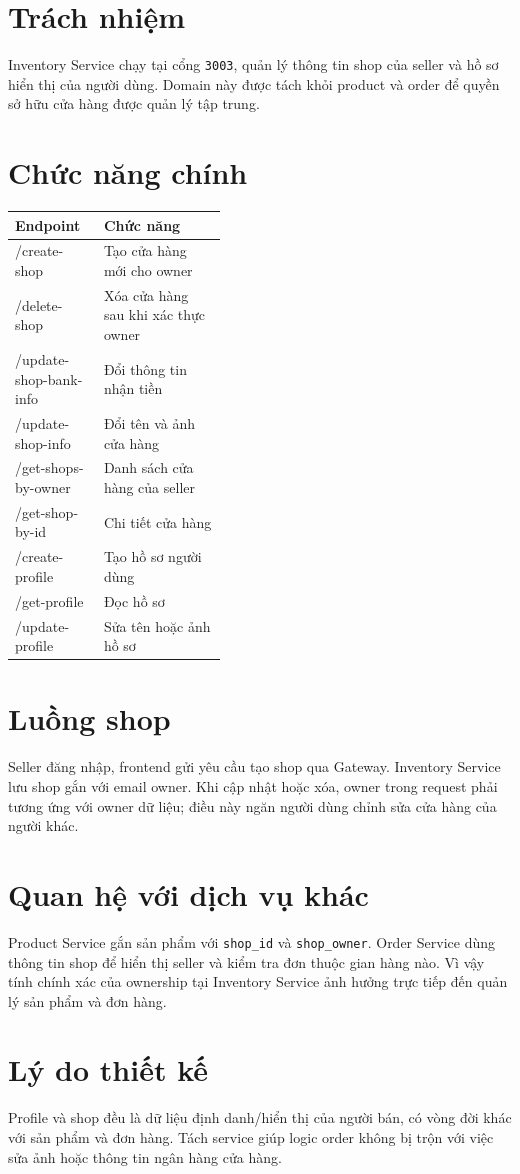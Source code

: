 \documentclass[12pt]{article}
\begin{document}

\section{Trách nhiệm}
Inventory Service chạy tại cổng \texttt{3003}, quản lý thông tin shop của seller và hồ sơ hiển thị của người dùng. Domain này được tách khỏi product và order để quyền sở hữu cửa hàng được quản lý tập trung.

\section{Chức năng chính}
\begin{tabularx}{\linewidth}{>{\ttfamily}p{0.42\linewidth} X}
\toprule
Endpoint & Chức năng \\
\midrule
/create-shop & Tạo cửa hàng mới cho owner \\
/delete-shop & Xóa cửa hàng sau khi xác thực owner \\
/update-shop-bank-info & Đổi thông tin nhận tiền \\
/update-shop-info & Đổi tên và ảnh cửa hàng \\
/get-shops-by-owner & Danh sách cửa hàng của seller \\
/get-shop-by-id & Chi tiết cửa hàng \\
/create-profile & Tạo hồ sơ người dùng \\
/get-profile & Đọc hồ sơ \\
/update-profile & Sửa tên hoặc ảnh hồ sơ \\
\bottomrule
\end{tabularx}

\section{Luồng shop}
Seller đăng nhập, frontend gửi yêu cầu tạo shop qua Gateway. Inventory Service lưu shop gắn với email owner. Khi cập nhật hoặc xóa, owner trong request phải tương ứng với owner dữ liệu; điều này ngăn người dùng chỉnh sửa cửa hàng của người khác.

\section{Quan hệ với dịch vụ khác}
Product Service gắn sản phẩm với \texttt{shop\_id} và \texttt{shop\_owner}. Order Service dùng thông tin shop để hiển thị seller và kiểm tra đơn thuộc gian hàng nào. Vì vậy tính chính xác của ownership tại Inventory Service ảnh hưởng trực tiếp đến quản lý sản phẩm và đơn hàng.

\section{Lý do thiết kế}
Profile và shop đều là dữ liệu định danh/hiển thị của người bán, có vòng đời khác với sản phẩm và đơn hàng. Tách service giúp logic order không bị trộn với việc sửa ảnh hoặc thông tin ngân hàng cửa hàng.
\end{document}
